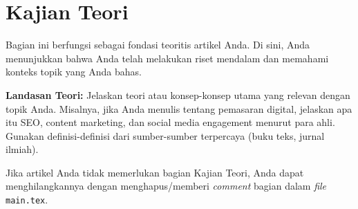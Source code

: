 \section{Kajian Teori} %


Bagian ini berfungsi sebagai fondasi teoritis artikel Anda. Di sini, Anda menunjukkan bahwa Anda telah melakukan riset mendalam dan memahami konteks topik yang Anda bahas.

\textbf{Landasan Teori:} Jelaskan teori atau konsep-konsep utama yang relevan dengan topik Anda. Misalnya, jika Anda menulis tentang pemasaran digital, jelaskan apa itu SEO, content marketing, dan social media engagement menurut para ahli. Gunakan definisi-definisi dari sumber-sumber terpercaya (buku teks, jurnal ilmiah).

Jika artikel Anda tidak memerlukan bagian Kajian Teori, Anda dapat menghilangkannya dengan menghapus/memberi \textit{comment} bagian \verb|| dalam \textit{file} \texttt{main.tex}.